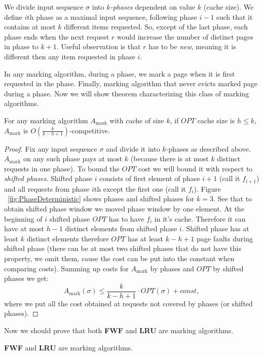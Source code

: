 We divide input sequence $\sigma$ into $k$\textit{-phases} dependent on value $k$ 
(cache size). We define $i$th phase as a maximal input sequence, following 
phase $i-1$ such that it contains at most $k$ different items requested. So, 
except of the last phase, each phase ends when the next request $r$ would 
increase the number of distinct pages in phase to $k+1$. Useful observation is 
that $r$ has to be \textit{new}, meaning it is different then any item requested 
in phase $i$.


In any marking algorithm, during a phase, we mark a page when it is first 
requested in the phase. Finally, marking algorithm that 
never evicts marked page during a phase. Now we will show theorem 
characterizing this class of marking algorithms.
\begin{theorem}
For any marking algorithm $A_{\mathrm{mark}}$ with cache of size $k$, if $OPT$ 
cache 
size is $h \leq k$, $A_{\mathrm{mark}}$ is $O(\frac{k}{k-h+1})$-competitive.
\end{theorem}
\begin{proof}
Fix any input sequence $\sigma$ and divide it into $k$-phases as described 
above. $A_{\mathrm{mark}}$ on any such phase pays at most $k$ (because there is 
at most 
$k$ distinct requests in one phase). To bound the $OPT$ cost we will bound it with 
respect to \textit{shifted phases}. Shifted phase $i$ consists 
of first element of phase $i+1$ (call it $f_{i+1}$) and all requests from phase 
$i$th except the first one (call it $f_i$). Figure 
~\ref{fig:PhaseDeterministic} shows phases and shifted phases for $k=3$. See 
that to obtain shifted phase window we moved phase window by one element. At 
the beginning of $i$ shifted phase $OPT$ has to have $f_i$ in it's cache. 
Therefore it can have at most $h-1$ distinct elements from shifted phase $i$. 
Shifted phase has at least $k$ distinct elements therefore $OPT$ has at least 
$k-h+1$ page faults during shifted phase (there can be at most two shifted 
phases that do not have this property, we omit them, cause the cost can be put 
into the constant when comparing costs).
Summing up costs for $A_{\mathrm{mark}}$ by phases and $OPT$ by shifted phases 
we get:
$$ A_{\mathrm{mark}}(\sigma) \leq \frac{k}{k-h+1} \cdot OPT(\sigma) + const,$$
where we put all the cost obtained at requests not covered by phases (or 
shifted phases).
\end{proof}
Now we should prove that both \textbf{FWF} and \textbf{LRU} are
marking algorithms.
\begin{propo}
 \textbf{FWF} and \textbf{LRU} are marking algorithms.
\end{propo}
